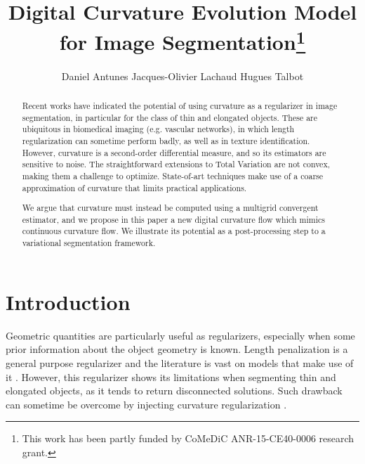 \documentclass[runningheads]{llncs}
\begin{document}
%
\title{Digital Curvature Evolution Model for Image Segmentation\thanks{This  work has  been  partly  funded by CoMeDiC ANR-15-CE40-0006 research grant.}}

\author{Daniel Antunes
Jacques-Olivier Lachaud
Hugues Talbot}
%
%
%
\maketitle              %
%
\begin{abstract}
  Recent works have indicated the potential of using curvature as a
  regularizer in image segmentation, in particular for the class of
  thin and elongated objects. These are ubiquitous in biomedical
  imaging (e.g. vascular networks), in which length regularization can
  sometime perform badly, as well as in texture
  identification. However, curvature is a second-order differential measure,
  and so its estimators are sensitive to noise. The straightforward
  extensions to Total Variation are not convex, making them a challenge
  to optimize.  State-of-art techniques make use of a coarse
  approximation of curvature that limits practical applications.

  We argue that curvature must instead be computed using a multigrid
  convergent estimator, and we propose in this paper a new digital
  curvature flow which mimics continuous curvature flow. We
  illustrate its potential as a post-processing step to a variational
  segmentation framework.
 
\end{abstract}
%
%
%
\setcounter{footnote}{0}
\section{Introduction}

Geometric quantities are particularly useful as regularizers, especially when some prior information about the object
geometry is known. Length penalization is a general purpose regularizer and the literature is vast on models
that make use of it \cite{casseles97,appleton05}. However, this regularizer shows its limitations when segmenting thin
and elongated objects, as it tends to return disconnected solutions. Such drawback can sometime be overcome by injecting
curvature regularization \cite{zehiry10}.
				
\end{document}
